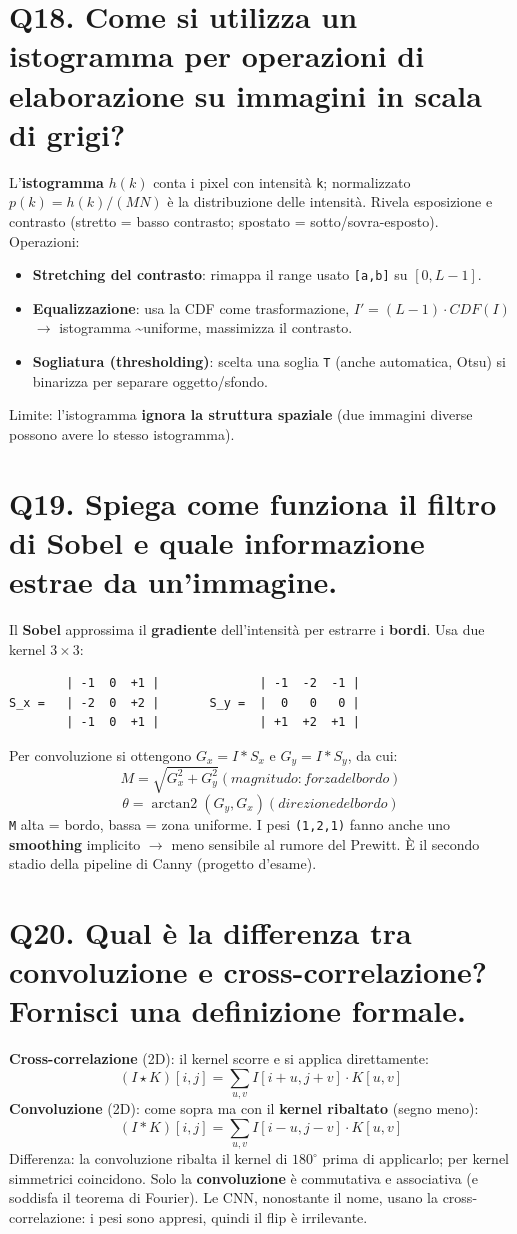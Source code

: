 \documentclass[11pt,a4paper]{article}
\begin{document}
\section*{Q18. Come si utilizza un istogramma per operazioni di elaborazione su immagini in scala di grigi?}
L'\textbf{istogramma} $h(k)$ conta i pixel con intensità \texttt{k}; normalizzato $p(k)=h(k)/(MN)$ è la distribuzione delle intensità. Rivela esposizione e contrasto (stretto = basso contrasto; spostato = sotto/sovra-esposto).
Operazioni:
\begin{itemize}
\item \textbf{Stretching del contrasto}: rimappa il range usato \texttt{[a,b]} su $[0,L-1]$.
\item \textbf{Equalizzazione}: usa la CDF come trasformazione, $I' = (L-1)\cdot CDF(I)$ $\to $ istogramma \textasciitilde{}uniforme, massimizza il contrasto.
\item \textbf{Sogliatura (thresholding)}: scelta una soglia \texttt{T} (anche automatica, Otsu) si binarizza per separare oggetto/sfondo.
\end{itemize}
Limite: l'istogramma \textbf{ignora la struttura spaziale} (due immagini diverse possono avere lo stesso istogramma).
\newpage
\section*{Q19. Spiega come funziona il filtro di Sobel e quale informazione estrae da un'immagine.}
Il \textbf{Sobel} approssima il \textbf{gradiente} dell'intensità per estrarre i \textbf{bordi}. Usa due kernel $3\times 3$:
\begin{verbatim}
        | -1  0  +1 |              | -1  -2  -1 |
S_x =   | -2  0  +2 |       S_y =  |  0   0   0 |
        | -1  0  +1 |              | +1  +2  +1 |
\end{verbatim}
Per convoluzione si ottengono $G_x = I*S_x$ e $G_y = I*S_y$, da cui:
\[ M = \sqrt{G_x^{2} + G_y^{2}}        (magnitudo: forza del bordo) \]
\[ \theta  = \operatorname{arctan2}(G_y, G_x)        (direzione del bordo) \]
\texttt{M} alta = bordo, bassa = zona uniforme. I pesi \texttt{(1,2,1)} fanno anche uno \textbf{smoothing} implicito $\to $ meno sensibile al rumore del Prewitt. È il secondo stadio della pipeline di Canny (progetto d'esame).
\newpage
\section*{Q20. Qual è la differenza tra convoluzione e cross-correlazione? Fornisci una definizione formale.}
\textbf{Cross-correlazione} (2D): il kernel scorre e si applica direttamente:
\[ (I \star  K)[i,j] = \sum _{u,v} I[i+u, j+v] \cdot  K[u,v] \]
\textbf{Convoluzione} (2D): come sopra ma con il \textbf{kernel ribaltato} (segno meno):
\[ (I * K)[i,j] = \sum _{u,v} I[i-u, j-v] \cdot  K[u,v] \]
Differenza: la convoluzione ribalta il kernel di $180^{\circ}$ prima di applicarlo; per kernel simmetrici coincidono. Solo la \textbf{convoluzione} è commutativa e associativa (e soddisfa il teorema di Fourier). Le CNN, nonostante il nome, usano la cross-correlazione: i pesi sono appresi, quindi il flip è irrilevante.
\newpage
\end{document}
